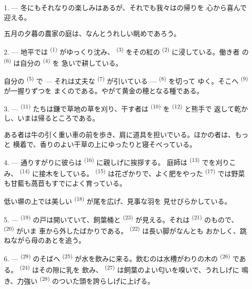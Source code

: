 1. --- 冬にもそれなりの楽しみはあるが、それでも我々はの帰りを
心から喜んで迎える。

五月の夕暮の農家の庭は、なんとうれしい眺めであろう。

2. --- 地平では \textsuperscript{(1)} がゆっくり沈み、
\textsuperscript{(3)} をその紅の \textsuperscript{(2)} に浸している。働き者
の \textsuperscript{(6)} は自分の \textsuperscript{(4)} を
急いで耕している。

自分の \textsuperscript{(5)} で --- それは丈夫な
\textsuperscript{(7)} が引いている ---  \textsuperscript{(8)} を切って
ゆく。そこへ \textsuperscript{(9)} が一握りずつを
まくのである。やがて黄金の穂となる種である。

3. ---  \textsuperscript{(11)} たちは鎌で草地の草を刈り、干す者は
 \textsuperscript{(10)} を \textsuperscript{(12)} と熊手で
返して乾かし、いまは帰るところである。

ある者は牛の引く重い車の前を歩き、肩に道具を担いでいる。ほかの者は、もっと
横着で、香りのよい干草の上にゆったりと寝そべっている。

4. --- 通りすがりに彼らは \textsuperscript{(16)} に親しげに挨拶する。
庭師は \textsuperscript{(13)} でを刈りこみ、
 \textsuperscript{(14)} に接木をしている。
\textsuperscript{(15)} は花ざかりで、よく肥をやった \textsuperscript{(17)}
では野菜も甘藍も萵苣もすでによく育っている。

低い塀の上では美しい \textsuperscript{(18)} が尾を広げ、見事な羽を
見せびらかしている。

\VUsaut{3.0mm}

5. ---  \textsuperscript{(19)} の戸は開いていて、飼葉桶と
 \textsuperscript{(23)} が見える。それは
\textsuperscript{(21)} のもので、 \textsuperscript{(20)} がいま
車から外したばかりである。 \textsuperscript{(22)} は長い脚がなんとも
おかしく、跳ねながら母のあとを追う。

6. ---  \textsuperscript{(29)} のそばへ
\textsuperscript{(25)} が水を飲みに来る。飲むのは水槽がわりの木の
\textsuperscript{(26)} である。 \textsuperscript{(24)} はその隙に乳を
飲み、 \textsuperscript{(27)} は飼葉のよい匂いを嗅いで、うれしげに
鳴き、力強い \textsuperscript{(28)} のついた頭を誇らしげに上げる。

